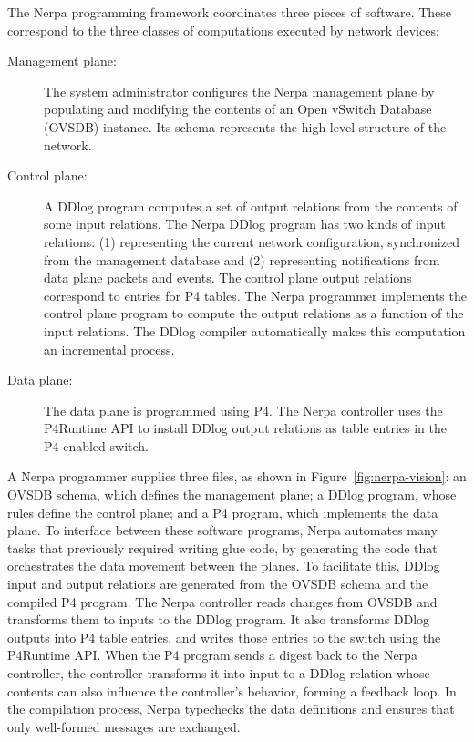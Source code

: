 \documentclass[sigconf, nonacm]{acmart}
\begin{document}
The Nerpa programming framework coordinates three pieces of software. These
correspond to the three classes of computations executed by
network devices:
\begin{description}
    \item[Management plane:] The system administrator configures the
    Nerpa management plane by populating and modifying
    the contents of an Open vSwitch Database (OVSDB) instance. Its schema represents the high-level structure of the
    network.
    \item[Control plane:] A DDlog program computes a set of output relations from the contents of some input relations. The Nerpa DDlog program has two kinds of
    input relations: (1) representing
    the current network configuration, synchronized from the management database and
    (2) representing notifications from data plane
    packets and events.  The control plane output relations correspond to
    entries for P4 tables.  The Nerpa programmer implements the control plane program
    to compute the output
    relations as a function of the input relations.  The DDlog compiler automatically
    makes this computation an incremental process.
    \item[Data plane:] The data plane is programmed using P4. The Nerpa controller
    uses the P4Runtime API to install DDlog output relations as table entries in the P4-enabled switch.
\end{description}

A Nerpa programmer supplies three files, as shown in Figure~\ref{fig:nerpa-vision}: an OVSDB schema, which defines the management plane; a DDlog program, whose rules define the control plane; and a P4 program, which implements the data plane. To interface between these software programs, Nerpa automates many tasks that previously required writing glue code, by generating the code that orchestrates the data movement between the planes. To facilitate this, DDlog input and output relations are generated from the OVSDB schema and the compiled P4 program. The Nerpa controller reads changes from OVSDB and transforms them to inputs to the DDlog program. It also transforms DDlog outputs into P4 table entries, and writes those entries to the switch using the P4Runtime API.  When the P4 program sends a digest back to the Nerpa controller, the controller
transforms it into input to a DDlog relation whose contents can also influence the controller's behavior, forming a feedback loop.  In the
compilation process, Nerpa typechecks the data definitions and ensures that only well-formed messages are exchanged.
\end{document}
